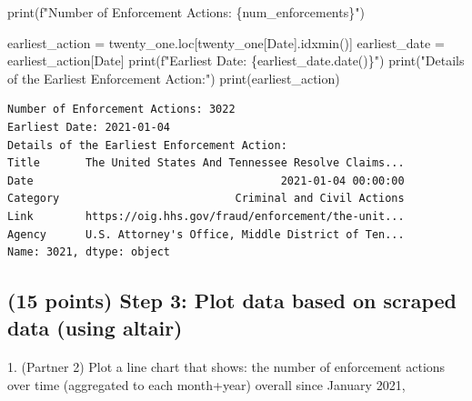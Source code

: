 \documentclass[
  letterpaper,
  DIV=11,
  numbers=noendperiod]{scrartcl}
\makeatletter
\let\oldparagraph\paragraph
\renewcommand{\paragraph}{
    \@ifstar
      \xxxParagraphStar
      \xxxParagraphNoStar
  }
\newcommand{\xxxParagraphStar}[1]{\oldparagraph*{#1}\mbox{}}
\newcommand{\xxxParagraphNoStar}[1]{\oldparagraph{#1}\mbox{}}
\newenvironment{Shaded}{\begin{snugshade}}{\end{snugshade}}
\newcommand{\BuiltInTok}[1]{\textcolor[rgb]{0.00,0.23,0.31}{#1}}
\newcommand{\NormalTok}[1]{\textcolor[rgb]{0.00,0.23,0.31}{#1}}
\newcommand{\OperatorTok}[1]{\textcolor[rgb]{0.37,0.37,0.37}{#1}}
\newcommand{\SpecialCharTok}[1]{\textcolor[rgb]{0.37,0.37,0.37}{#1}}
\newcommand{\SpecialStringTok}[1]{\textcolor[rgb]{0.13,0.47,0.30}{#1}}
\newcommand{\StringTok}[1]{\textcolor[rgb]{0.13,0.47,0.30}{#1}}
\makeatother
\begin{document}
\begin{Shaded}
\begin{Highlighting}[]
\BuiltInTok{print}\NormalTok{(}\SpecialStringTok{f"Number of Enforcement Actions: }\SpecialCharTok{\{}\NormalTok{num\_enforcements}\SpecialCharTok{\}}\SpecialStringTok{"}\NormalTok{)}

\NormalTok{earliest\_action }\OperatorTok{=}\NormalTok{ twenty\_one.loc[twenty\_one[}\StringTok{\textquotesingle{}Date\textquotesingle{}}\NormalTok{].idxmin()]}
\NormalTok{earliest\_date }\OperatorTok{=}\NormalTok{ earliest\_action[}\StringTok{\textquotesingle{}Date\textquotesingle{}}\NormalTok{]}
\BuiltInTok{print}\NormalTok{(}\SpecialStringTok{f"Earliest Date: }\SpecialCharTok{\{}\NormalTok{earliest\_date}\SpecialCharTok{.}\NormalTok{date()}\SpecialCharTok{\}}\SpecialStringTok{"}\NormalTok{)}
\BuiltInTok{print}\NormalTok{(}\StringTok{"Details of the Earliest Enforcement Action:"}\NormalTok{)}
\BuiltInTok{print}\NormalTok{(earliest\_action)}
\end{Highlighting}
\end{Shaded}

\begin{verbatim}
Number of Enforcement Actions: 3022
Earliest Date: 2021-01-04
Details of the Earliest Enforcement Action:
Title       The United States And Tennessee Resolve Claims...
Date                                      2021-01-04 00:00:00
Category                           Criminal and Civil Actions
Link        https://oig.hhs.gov/fraud/enforcement/the-unit...
Agency      U.S. Attorney's Office, Middle District of Ten...
Name: 3021, dtype: object
\end{verbatim}

\subsection{(15 points) Step 3: Plot data based on scraped data (using
altair)}\label{points-step-3-plot-data-based-on-scraped-data-using-altair}

\paragraph{1. (Partner 2) Plot a line chart that shows: the number of
enforcement actions over time (aggregated to each month+year) overall
since January
2021,}\label{partner-2-plot-a-line-chart-that-shows-the-number-of-enforcement-actions-over-time-aggregated-to-each-monthyear-overall-since-january-2021}
\end{document}
